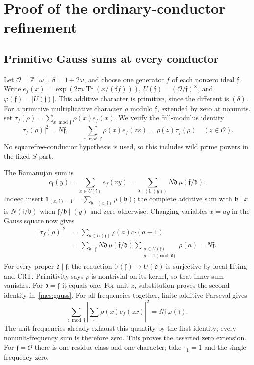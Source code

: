 \section{Proof of the ordinary-conductor refinement}\label{mcs:details}
\subsection{Primitive Gauss sums at every conductor}
Let $\mathcal O=\mathbb Z[\omega]$, $\delta=1+2\omega$, and choose one
generator $f$ of each nonzero ideal $\mathfrak f$. Write
$e_f(x)=\exp(2\pi i\operatorname{Tr}(x/(\delta f)))$,
$U(\mathfrak f)=(\mathcal O/\mathfrak f)^\times$, and
$\varphi(\mathfrak f)=|U(\mathfrak f)|$.
This additive character is primitive, since the different is $(\delta)$.
For a primitive multiplicative character $\rho$ modulo $\mathfrak f$,
extended by zero at nonunits, set
$\tau_f(\rho)=\sum_{x\bmod\mathfrak f}\rho(x)e_f(x)$.
We verify the full-modulus identity
\begin{equation}\label{mcs:gauss}
 |\tau_f(\rho)|^2=N\mathfrak f,\qquad
 \sum_{x\bmod\mathfrak f}\rho(x)e_f(zx)
       =\overline{\rho(z)}\tau_f(\rho)\quad(z\in\mathcal O).
\end{equation}
No squarefree-conductor hypothesis is used, so this includes wild
prime powers in the fixed $S$-part.

The Ramanujan sum is
\[
 c_{\mathfrak f}(y)=\sum_{x\in U(\mathfrak f)}e_f(xy)
   =\sum_{\mathfrak d\mid(\mathfrak f,(y))}
                   N\mathfrak d\,\mu(\mathfrak f/\mathfrak d).
\]
Indeed insert $\mathbf1_{(x,\mathfrak f)=1}
=\sum_{\mathfrak b\mid(x,\mathfrak f)}\mu(\mathfrak b)$;
the complete additive sum with $\mathfrak b\mid x$ is
$N(\mathfrak f/\mathfrak b)$ when
$\mathfrak f/\mathfrak b\mid(y)$ and zero otherwise.
Changing variables $x=ay$ in the Gauss square now gives
\begin{align*}
 |\tau_f(\rho)|^2
 &=\sum_{a\in U(\mathfrak f)}\rho(a)c_{\mathfrak f}(a-1)\\
 &=\sum_{\mathfrak d\mid\mathfrak f}N\mathfrak d\,
       \mu(\mathfrak f/\mathfrak d)
       \sum_{\substack{a\in U(\mathfrak f)\\a\equiv1\pmod{\mathfrak d}}}
                  \rho(a)=N\mathfrak f.
\end{align*}
For every proper $\mathfrak d\mid\mathfrak f$, the reduction
$U(\mathfrak f)\to U(\mathfrak d)$ is surjective by local lifting and CRT.
Primitivity says $\rho$ is nontrivial on its kernel, so that inner sum
vanishes. For $\mathfrak d=\mathfrak f$ it equals one.
For unit $z$, substitution proves the second identity in~\eqref{mcs:gauss}.
For all frequencies together, finite additive Parseval gives
\[
 \sum_{z\bmod\mathfrak f}
   \left|\sum_x\rho(x)e_f(zx)\right|^2
       =N\mathfrak f\,\varphi(\mathfrak f).
\]
The unit frequencies already exhaust this quantity by the first identity;
every nonunit-frequency sum is therefore zero. This proves the asserted
zero extension. For $\mathfrak f=\mathcal O$ there is one residue class
and one character; take $\tau_1=1$ and the single frequency zero.


